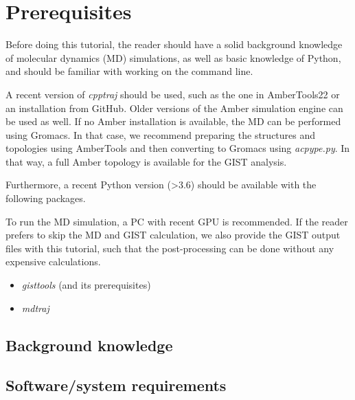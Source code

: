 \documentclass[9pt,tutorial]{livecoms}
\newcommand{\software}{\emph}
\begin{document}
\section{Prerequisites}
Before doing this tutorial, the reader should have a solid background knowledge of molecular dynamics (MD) simulations, as well as basic knowledge of Python, and should be familiar with working on the command line.

A recent version of \software{cpptraj} should be used, such as the one in AmberTools22 or an installation from GitHub.
Older versions of the Amber simulation engine can be used as well.
If no Amber installation is available, the MD can be performed using Gromacs.
In that case, we recommend preparing the structures and topologies using AmberTools and then converting to Gromacs using \software{acpype.py}.
In that way, a full Amber topology is available for the GIST analysis.

Furthermore, a recent Python version (>3.6) should be available with the following packages.

To run the MD simulation, a PC with recent GPU is recommended.
If the reader prefers to skip the MD and GIST calculation, we also provide the GIST output files with this tutorial, such that the post-processing can be done without any expensive calculations.

\begin{itemize}
	\item \software{gisttools} (and its prerequisites)
	\item \software{mdtraj}
\end{itemize}

\subsection{Background knowledge}

\subsection{Software/system requirements}
\end{document}
